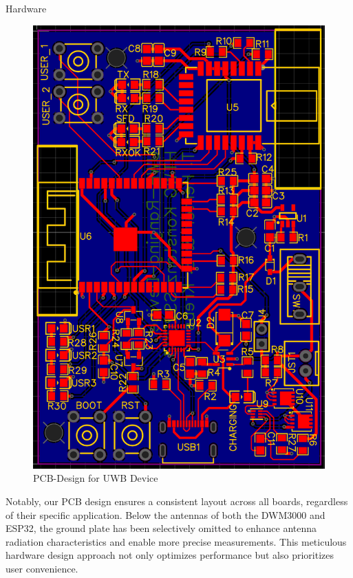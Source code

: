\documentclass[final]{beamer}
\newlength{\colwidth}
\begin{document}
\begin{frame}[t]
\begin{columns}[t]
\begin{column}{\colwidth}
\begin{block}{Hardware}
    \begin{figure}
      \includegraphics[scale=0.8, angle=90]{pics/pcb_design.png}
      \caption{PCB-Design for UWB Device}
    \end{figure}

    Notably, our PCB design ensures a consistent layout across all boards,
    regardless of their specific application.
    Below the antennas of both the DWM3000 and ESP32,
    the ground plate has been selectively omitted to enhance antenna radiation
    characteristics and enable more precise measurements.
    This meticulous hardware design approach not only optimizes
    performance but also prioritizes user convenience. 
  \end{block}
\end{column}


\end{columns}
\end{frame}
\end{document}
